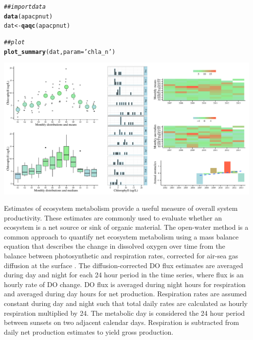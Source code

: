 \documentclass[10pt,letterpaper]{article}\usepackage[]{graphicx}\usepackage[]{color}
\makeatletter
\def\maxwidth{ %
  \ifdim\Gin@nat@width>\linewidth
    \linewidth
  \else
    \Gin@nat@width
  \fi
}
\newcommand{\hlstr}[1]{\textcolor[rgb]{0.192,0.494,0.8}{#1}}%
\newcommand{\hlcom}[1]{\textcolor[rgb]{0.678,0.584,0.686}{\textit{#1}}}%
\newcommand{\hlstd}[1]{\textcolor[rgb]{0.345,0.345,0.345}{#1}}%
\newcommand{\hlkwb}[1]{\textcolor[rgb]{0.69,0.353,0.396}{#1}}%
\newcommand{\hlkwc}[1]{\textcolor[rgb]{0.333,0.667,0.333}{#1}}%
\newcommand{\hlkwd}[1]{\textcolor[rgb]{0.737,0.353,0.396}{\textbf{#1}}}%
\newenvironment{kframe}{%
 \def\at@end@of@kframe{}%
 \ifinner\ifhmode%
  \def\at@end@of@kframe{\end{minipage}}%
  \begin{minipage}{\columnwidth}%
 \fi\fi%
 \def\FrameCommand##1{\hskip\@totalleftmargin \hskip-\fboxsep
 \colorbox{shadecolor}{##1}\hskip-\fboxsep
     \hskip-\linewidth \hskip-\@totalleftmargin \hskip\columnwidth}%
 \MakeFramed {\advance\hsize-\width
   \@totalleftmargin\z@ \linewidth\hsize
   \@setminipage}}%
 {\par\unskip\endMakeFramed%
 \at@end@of@kframe}
\newenvironment{knitrout}{}{} %
\makeatother
\begin{document}
\begin{knitrout}
\color{fgcolor}\begin{kframe}
\begin{alltt}
\hlcom{## import data}
\hlkwd{data}\hlstd{(apacpnut)}
\hlstd{dat} \hlkwb{<-} \hlkwd{qaqc}\hlstd{(apacpnut)}

\hlcom{## plot}
\hlkwd{plot_summary}\hlstd{(dat,} \hlkwc{param} \hlstd{=} \hlstr{'chla_n'}\hlstd{)}
\end{alltt}
\end{kframe}

{\centering \includegraphics[width=\maxwidth]{figure/unnamed-chunk-20} 

}



\end{knitrout}

Estimates of ecosystem metabolism provide a useful measure of overall system productivity.  These estimates are commonly used to evaluate whether an ecosystem is a net source or sink of organic material.  The open-water method is a common approach to quantify net ecosystem metabolism using a mass balance equation that describes the change in dissolved oxygen over time from the balance between photosynthetic and respiration rates, corrected for air-sea gas diffusion at the surface \cite{Odum56}.  The diffusion-corrected DO flux estimates are averaged during day and night for each 24 hour period in the time series, where flux is an hourly rate of DO change. DO flux is averaged during night hours for respiration and averaged during day hours for net production. Respiration rates are assumed constant during day and night such that total daily rates are calculated as hourly respiration multiplied by 24. The metabolic day is considered the 24 hour period between sunsets on two adjacent calendar days.  Respiration is subtracted from daily net production estimates to yield gross production.  
\end{document}
